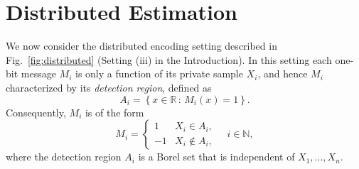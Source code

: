 \documentclass[letterpaper, 11pt]{IEEEtran}      %
\newcommand{\sgn}{\mathrm{sgn} }
\begin{document}
\begin{comment}
\subsection{Relation to Sigma-Delta Modulation \label{subsec:sdm}}
The SDM is a device that converts continuous-time analog signals to a discrete-time sequence of binary digits. The basic operation of a SDM can be described as follows: the modulator takes as input a sequence of continuous amplitude samples $X_n$, which are typically represents samples of a continuous-time signal taken uniformly at sampling rate $f_s$ much higher than the Nyquist rate of the signal \cite{1095151}. The output of the modulator is a sequence $M_n$ of binary values, obtained according to the following rule: 
\begin{align}
\begin{cases} V_{n+1} & =  V_n - \alpha q(V_n) + X_n, \\
M_n & = \sgn(V_n)  \end{cases}, \quad n=1,2,\ldots, \label{eq:sdm}
\end{align}
where $\alpha > 0$ is a parameter of the modulator that is determined by the maximal value of the input sequence $X^n$. The SDM of the form \eqref{eq:sdm} was studied in \cite{53738} under the assumption that the input process $X_n$ is an i.i.d Gaussian process. The main results from \cite{53738} shows that regardless of the initial state $V_0$, the process $M_n$ is a stationary ergodic process with mean $\theta$. It follows that a consistent estimation of $\theta$ is obtained by taking the mean of the sequence $\{M_n\}$. However, the results from \cite{53738} does not provide a closed form for the second order statistics of $\{M_n\}$, so that convergence rate cannot be derived from \cite{53738}.  
\end{comment}

\section{Distributed Estimation \label{sec:distributed}}
We now consider the distributed encoding setting described in Fig.~\ref{fig:distributed} (Setting (iii) in the Introduction). In this setting each one-bit message $M_i$ is only a function of its private sample $X_i$, and hence $M_i$ characterized by its \emph{detection region}, defined as 
\[
A_i = \left\{ x \in \mathbb R \,:\, M_i(x) = 1 \right\}.
\]
Consequently, $M_i$ is of the form
\[
M_i = \begin{cases} 1 & X_i \in A_i, \\
-1 & X_i \notin A_i,
\end{cases} \quad i\in \mathbb N,
\]
where the detection region $A_i$ is a Borel set that is independent of $X_1,\ldots,X_n$.\\
\end{document}
